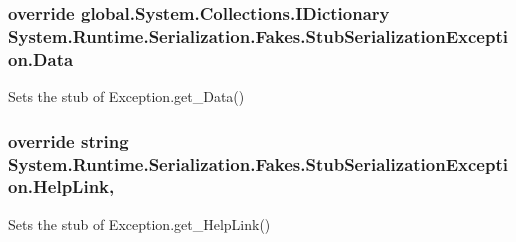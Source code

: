 \hypertarget{class_system_1_1_runtime_1_1_serialization_1_1_fakes_1_1_stub_serialization_exception_a1e66d29e5ccf54c10e99d25e12a347c8}{
\subsubsection[{Data}]{\setlength{\rightskip}{0pt plus 5cm}override global.\-System.\-Collections.\-I\-Dictionary System.\-Runtime.\-Serialization.\-Fakes.\-Stub\-Serialization\-Exception.\-Data\hspace{0.3cm}{\ttfamily [get]}}}\label{class_system_1_1_runtime_1_1_serialization_1_1_fakes_1_1_stub_serialization_exception_a1e66d29e5ccf54c10e99d25e12a347c8}


Sets the stub of Exception.\-get\-\_\-\-Data()

\hypertarget{class_system_1_1_runtime_1_1_serialization_1_1_fakes_1_1_stub_serialization_exception_aa4e604a41b86c50951b7cdf4853132fb}{
\subsubsection[{Help\-Link}]{\setlength{\rightskip}{0pt plus 5cm}override string System.\-Runtime.\-Serialization.\-Fakes.\-Stub\-Serialization\-Exception.\-Help\-Link\hspace{0.3cm}{\ttfamily [get]}, {\ttfamily [set]}}}\label{class_system_1_1_runtime_1_1_serialization_1_1_fakes_1_1_stub_serialization_exception_aa4e604a41b86c50951b7cdf4853132fb}


Sets the stub of Exception.\-get\-\_\-\-Help\-Link()

